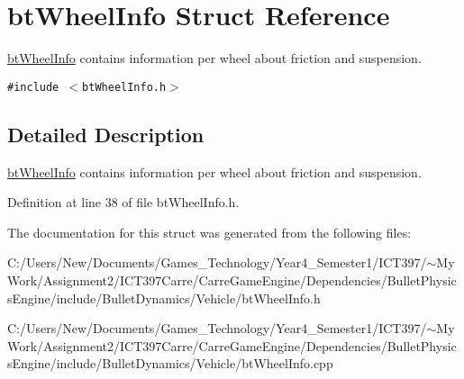 \hypertarget{structbt_wheel_info}{
\section{btWheelInfo Struct Reference}
\label{structbt_wheel_info}
}
\hyperlink{structbt_wheel_info}{btWheelInfo} contains information per wheel about friction and suspension.  


{\tt \#include $<$btWheelInfo.h$>$}



\subsection{Detailed Description}
\hyperlink{structbt_wheel_info}{btWheelInfo} contains information per wheel about friction and suspension. 

Definition at line 38 of file btWheelInfo.h.

The documentation for this struct was generated from the following files:\begin{CompactItemize}
\item 
C:/Users/New/Documents/Games\_\-Technology/Year4\_\-Semester1/ICT397/$\sim$My Work/Assignment2/ICT397Carre/CarreGameEngine/Dependencies/BulletPhysicsEngine/include/BulletDynamics/Vehicle/btWheelInfo.h\item 
C:/Users/New/Documents/Games\_\-Technology/Year4\_\-Semester1/ICT397/$\sim$My Work/Assignment2/ICT397Carre/CarreGameEngine/Dependencies/BulletPhysicsEngine/include/BulletDynamics/Vehicle/btWheelInfo.cpp\end{CompactItemize}
